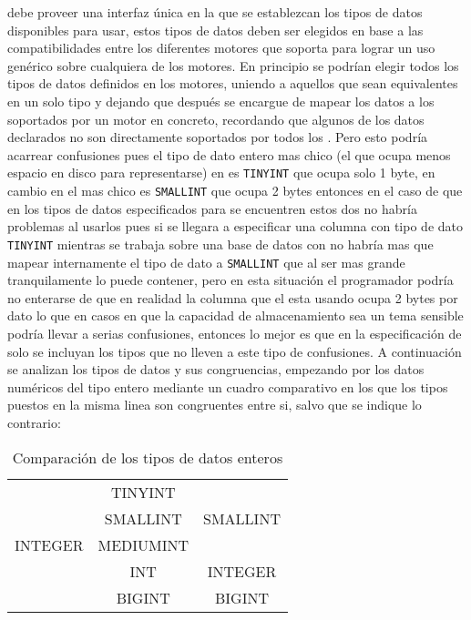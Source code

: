 \jj debe proveer una interfaz única en la que se establezcan los tipos de datos disponibles para usar, estos tipos de datos deben ser elegidos en base a las compatibilidades entre los diferentes motores que soporta para lograr un uso genérico sobre cualquiera de los motores. En principio se podrían elegir todos los tipos de datos definidos en los motores, uniendo a aquellos que sean equivalentes en un solo tipo y dejando que después \jj se encargue de mapear los datos a los soportados por un motor en concreto, recordando que algunos de los datos declarados no son directamente soportados por todos los \dd. Pero esto podría acarrear confusiones pues el tipo de dato entero mas chico (el que ocupa menos espacio en disco para representarse) en \m\cite{mysql:datatypes} es \verb=TINYINT= que ocupa solo 1 byte, en cambio en \p\cite{postgre:datatypes} el mas chico es \verb=SMALLINT= que ocupa 2 bytes entonces en el caso de que en los tipos de datos especificados para \jj se encuentren estos dos no habría problemas al usarlos pues si se llegara a especificar una columna con tipo de dato \verb=TINYINT= mientras se trabaja sobre una base de datos con \p no habría mas que mapear internamente el tipo de dato a \verb=SMALLINT= que al ser mas grande tranquilamente lo puede contener, pero en esta situación el programador podría no enterarse de que en realidad la columna que el esta usando ocupa 2 bytes por dato lo que en casos en que  la capacidad  de almacenamiento sea un tema sensible podría llevar a serias confusiones, entonces lo mejor es que en la especificación de \jj solo se incluyan los tipos que no lleven a este tipo de confusiones. A continuación se analizan los tipos de datos y sus congruencias, empezando por los datos numéricos del tipo entero mediante un cuadro comparativo en los que los tipos puestos en la misma linea son congruentes entre si, salvo que se indique lo contrario:
%        
\begin{table}[h]
\begin{center}
\begin{tabular}{|c|c|c|}
\hline \s      & \m        & \p \\ 
\hline         & TINYINT   &  \\ 
               & SMALLINT  & SMALLINT \\ 
       INTEGER & MEDIUMINT &  \\
               & INT       & INTEGER \\
               & BIGINT    & BIGINT \\  
\hline 
\end{tabular} 
\end{center}
\caption{Comparación de los tipos de datos enteros}
\end{table}
